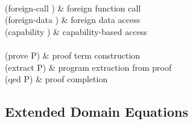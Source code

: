 \begin{grammar}
 \\
 (foreign-call \I{} \T{} \arbno{\E}) & foreign function call \\
 (foreign-data \I{} \T) & foreign data access \\
 (capability \I{} \E) & capability-based access \\[0.5em]

 \\
 (prove \T{} P) & proof term construction \\
 (extract P) & program extraction from proof \\
 (qed P) & proof completion
\end{grammar}

\subsection{Extended Domain Equations}


